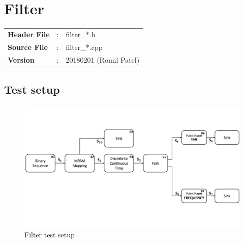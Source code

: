 \section{Filter}
\begin{tcolorbox}	
	\begin{tabular}{p{2.75cm} p{0.2cm} p{10.5cm}} 	
		\textbf{Header File}   &:& filter\_*.h \\
		\textbf{Source File}   &:& filter\_*.cpp \\
		\textbf{Version}       &:& 20180201 (Romil Patel)
	\end{tabular}
\end{tcolorbox}
\subsection*{Test setup}
\begin{figure}[h]
	\centering
	\includegraphics[width=14cm]{./algorithms/filter/figures/Test_Filter_Dia.pdf}
	\caption{Filter test setup}
	\label{FilterTest}
\end{figure}

